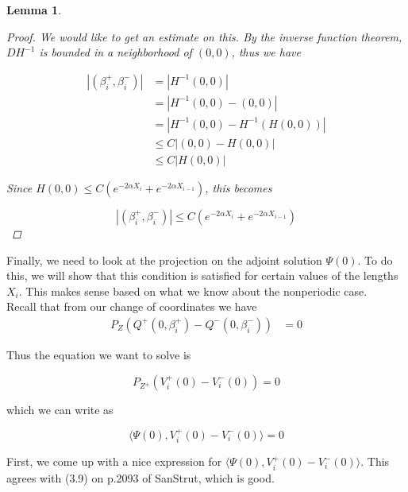 \documentclass[12pt]{article}
\newtheorem{lemma}{Lemma}
\begin{document}
\begin{lemma}
\begin{proof}
We would like to get an estimate on this. By the inverse function theorem, $D H^{-1}$ is bounded in a neighborhood of $(0, 0)$, thus we have 

\begin{align*}
| (\beta_i^+, \beta_i^-) | &= | H^{-1}(0, 0) | \\
&= | H^{-1}(0, 0) - (0, 0) | \\
&= | H^{-1}(0, 0) - H^{-1}(H(0, 0)) | \\
& \leq C | (0, 0) - H(0, 0) | \\
& \leq C |H(0, 0)|
\end{align*}

Since $H(0, 0) \leq C (e^{-2 \alpha X_i} + e^{-2 \alpha X_{i-1}})$, this becomes

\[
| (\beta_i^+, \beta_i^-) | \leq C (e^{-2 \alpha X_i} + e^{-2 \alpha X_{i-1}})
\]

\end{proof}
\end{lemma}

Finally, we need to look at the projection on the adjoint solution $\Psi(0)$. To do this, we will show that this condition is satisfied for certain values of the lengths $X_i$. This makes sense based on what we know about the nonperiodic case.\\

Recall that from our change of coordinates we have
\begin{align*}
P_{Z}(Q^+(0, \beta_i^+) - Q^-(0, \beta_i^-)) &= 0
\end{align*}

Thus the equation we want to solve is

\begin{equation}
P_{Z^\pm}(V_i^+(0) - V_i^-(0)) = 0
\end{equation}

which we can write as

\begin{equation}
\langle \Psi(0), V_i^+(0) - V_i^-(0) \rangle = 0
\end{equation}

First, we come up with a nice expression for $\langle \Psi(0), V_i^+(0) - V_i^-(0) \rangle$. This agrees with (3.9) on p.2093 of SanStrut, which is good.

\end{document}
